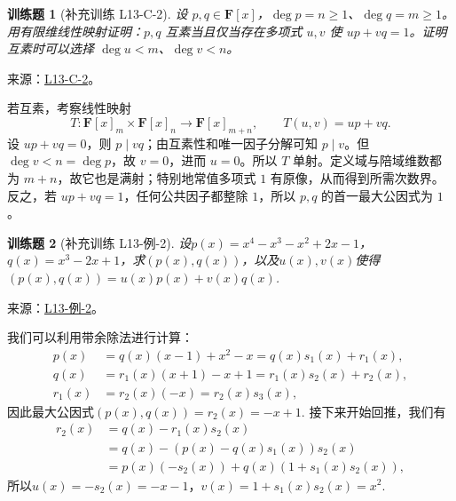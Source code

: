 \documentclass[12pt,fontset=fandol]{ctexart}
\newtheorem{exercise}{训练题}[section]
\begin{document}
\begin{exercise}[补充训练 L13-C-2]\label{prob:L13-C-2}
设 $p,q\in\mathbf F[x]$，$\deg p=n\ge1$、$\deg q=m\ge1$。用有限维线性映射证明：$p,q$ 互素当且仅当存在多项式 $u,v$ 使 $up+vq=1$。证明互素时可以选择 $\deg u<m$、$\deg v<n$。
\end{exercise}
\noindent 来源：\href{https://github.com/yhwu-is/Linear-Algebra-Left-Undone/blob/new/%E8%AE%B2%E4%B9%89/%E4%B8%93%E9%A2%98/13%20%E5%A4%9A%E9%A1%B9%E5%BC%8F.tex}{L13-C-2}。
\begin{solve}
若互素，考察线性映射
\[T:\mathbf F[x]_m\times\mathbf F[x]_n\longrightarrow\mathbf F[x]_{m+n},\qquad T(u,v)=up+vq.\]
设 $up+vq=0$，则 $p\mid vq$；由互素性和唯一因子分解可知 $p\mid v$。但 $\deg v<n=\deg p$，故 $v=0$，进而 $u=0$。所以 $T$ 单射。定义域与陪域维数都为 $m+n$，故它也是满射；特别地常值多项式 $1$ 有原像，从而得到所需次数界。反之，若 $up+vq=1$，任何公共因子都整除 $1$，所以 $p,q$ 的首一最大公因式为 $1$。
\end{solve}

\begin{exercise}[补充训练 L13-例-2]\label{prob:L13-例-2}
设$p(x)=x^4-x^3-x^2+2x-1$，$q(x)=x^3-2x+1$，求$(p(x),q(x))$，以及$u(x),v(x)$使得$(p(x),q(x))=u(x)p(x)+v(x)q(x)$.
\end{exercise}
\noindent 来源：\href{https://github.com/yhwu-is/Linear-Algebra-Left-Undone/blob/new/%E8%AE%B2%E4%B9%89/%E4%B8%93%E9%A2%98/13%20%E5%A4%9A%E9%A1%B9%E5%BC%8F.tex}{L13-例-2}。
\begin{solve}
我们可以利用带余除法进行计算：
    \begin{align*}
        p(x)   & =q(x)(x-1)+x^2-x=q(x)s_1(x)+r_1(x),   \\
        q(x)   & =r_1(x)(x+1)-x+1=r_1(x)s_2(x)+r_2(x), \\
        r_1(x) & =r_2(x)(-x)=r_2(x)s_3(x),
    \end{align*}
    因此最大公因式$(p(x),q(x))=r_2(x)=-x+1$. 接下来开始回推，我们有
    \begin{align*}
        r_2(x) & =q(x)-r_1(x)s_2(x)                   \\
               & =q(x)-(p(x)-q(x)s_1(x))s_2(x)        \\
               & =p(x)(-s_2(x))+q(x)(1+s_1(x)s_2(x)),
    \end{align*}
    所以$u(x)=-s_2(x)=-x-1$，$v(x)=1+s_1(x)s_2(x)=x^2$.
\end{solve}
\end{document}
